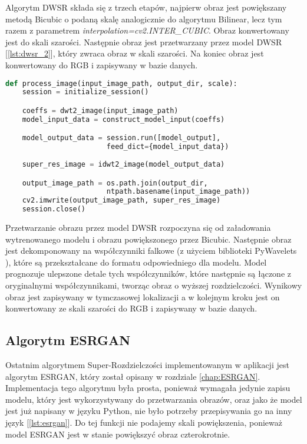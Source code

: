 Algorytm DWSR składa się z trzech etapów, najpierw obraz jest powiększany metodą Bicubic o podaną skalę analogicznie do algorytmu Bilinear, lecz tym razem z parametrem \textit{interpolation=cv2.INTER\_CUBIC}. Obraz konwertowany jest do skali szarości. Następnie obraz jest przetwarzany przez model DWSR [\ref{lst:dwsr_2}], który zwraca obraz w skali szarości. Na koniec obraz jest konwertowany do RGB i zapisywany w bazie danych.


\begin{lstlisting}[language=Python, caption=Przetwarzanie przez model DWSR., label={lst:dwsr_2}]    
def process_image(input_image_path, output_dir, scale):
    session = initialize_session()

    coeffs = dwt2_image(input_image_path)
    model_input_data = construct_model_input(coeffs)

    model_output_data = session.run([model_output], 
                        feed_dict={model_input_data})
    
    super_res_image = idwt2_image(model_output_data)

    output_image_path = os.path.join(output_dir, 
                        ntpath.basename(input_image_path))
    cv2.imwrite(output_image_path, super_res_image)        
    session.close()

\end{lstlisting}

Przetwarzanie obrazu przez model DWSR rozpoczyna się od załadowania wytrenowanego modelu i obrazu powiększonego przez Bicubic. Następnie obraz jest dekomponowany na współczynniki falkowe (z użyciem biblioteki PyWavelets \cite{pywavelets}), które są przekształcane do formatu odpowiedniego dla modelu. Model prognozuje ulepszone detale tych współczynników, które następnie są łączone z oryginalnymi współczynnikami, tworząc obraz o wyższej rozdzielczości. Wynikowy obraz jest zapisywany w tymczasowej lokalizacji a w kolejnym kroku jest on konwertowany ze skali szarości do RGB i zapisywany w bazie danych.


\subsection*{Algorytm ESRGAN}

Ostatnim algorytmem Super-Rozdzielczości implementowanym w aplikacji jest algorytm ESRGAN, który został opisany w rozdziale \ref{chap:ESRGAN}.
Implementacja tego algorytmu była prosta, ponieważ wymagała jedynie zapisu modelu, który jest wykorzystywany do przetwarzania obrazów, oraz jako że model jest już napisany w języku Python, nie było potrzeby przepisywania go na inny język [\ref{lst:esrgan}]. Do tej funkcji nie podajemy skali powiększenia, ponieważ model ESRGAN jest w stanie powiększyć obraz czterokrotnie.

